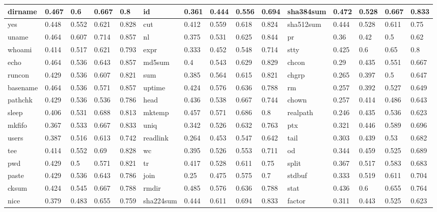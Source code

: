 \begin{table*}[h!]
\begin{center}
\begin{tabular}{ | l | l | l | l | l | l | l | l | l | l | l | l | l | l | l | }
	dirname & 0.467 & 0.6 & 0.667 & 0.8 & id & 0.361 & 0.444 & 0.556 & 0.694 & sha384sum & 0.472 & 0.528 & 0.667 & 0.833 \\ \hline
	yes & 0.448 & 0.552 & 0.621 & 0.828 & cut & 0.412 & 0.559 & 0.618 & 0.824 & sha512sum & 0.444 & 0.528 & 0.611 & 0.75 \\ \hline
	uname & 0.464 & 0.607 & 0.714 & 0.857 & nl & 0.375 & 0.531 & 0.625 & 0.844 & pr & 0.36 & 0.42 & 0.5 & 0.62 \\ \hline
	whoami & 0.414 & 0.517 & 0.621 & 0.793 & expr & 0.333 & 0.452 & 0.548 & 0.714 & stty & 0.425 & 0.6 & 0.65 & 0.8 \\ \hline
	echo & 0.464 & 0.536 & 0.643 & 0.857 & md5sum & 0.4 & 0.543 & 0.629 & 0.829 & chcon & 0.29 & 0.435 & 0.551 & 0.667 \\ \hline
	runcon & 0.429 & 0.536 & 0.607 & 0.821 & sum & 0.385 & 0.564 & 0.615 & 0.821 & chgrp & 0.265 & 0.397 & 0.5 & 0.647 \\ \hline
	basename & 0.464 & 0.536 & 0.571 & 0.857 & uptime & 0.424 & 0.576 & 0.636 & 0.788 & rm & 0.257 & 0.392 & 0.527 & 0.649 \\ \hline
	pathchk & 0.429 & 0.536 & 0.536 & 0.786 & head & 0.436 & 0.538 & 0.667 & 0.744 & chown & 0.257 & 0.414 & 0.486 & 0.643 \\ \hline
	sleep & 0.406 & 0.531 & 0.688 & 0.813 & mktemp & 0.457 & 0.571 & 0.686 & 0.8 & realpath & 0.246 & 0.435 & 0.536 & 0.623 \\ \hline
	mkfifo & 0.367 & 0.533 & 0.667 & 0.833 & uniq & 0.342 & 0.526 & 0.632 & 0.763 & ptx & 0.321 & 0.446 & 0.589 & 0.696 \\ \hline
	users & 0.387 & 0.516 & 0.613 & 0.742 & readlink & 0.264 & 0.453 & 0.547 & 0.642 & tail & 0.303 & 0.439 & 0.53 & 0.682 \\ \hline
	tee & 0.414 & 0.552 & 0.69 & 0.828 & wc & 0.395 & 0.526 & 0.553 & 0.711 & od & 0.344 & 0.459 & 0.525 & 0.689 \\ \hline
	pwd & 0.429 & 0.5 & 0.571 & 0.821 & tr & 0.417 & 0.528 & 0.611 & 0.75 & split & 0.367 & 0.517 & 0.583 & 0.683 \\ \hline
	paste & 0.429 & 0.536 & 0.643 & 0.786 & join & 0.25 & 0.475 & 0.575 & 0.7 & stdbuf & 0.333 & 0.519 & 0.611 & 0.704 \\ \hline
	cksum & 0.424 & 0.545 & 0.667 & 0.788 & rmdir & 0.485 & 0.576 & 0.636 & 0.788 & stat & 0.436 & 0.6 & 0.655 & 0.764 \\ \hline
	nice & 0.379 & 0.483 & 0.655 & 0.759 & sha224sum & 0.444 & 0.611 & 0.694 & 0.833 & factor & 0.311 & 0.443 & 0.525 & 0.623 \\ \hline

\end{tabular}
\end{center}
\end{table*}
